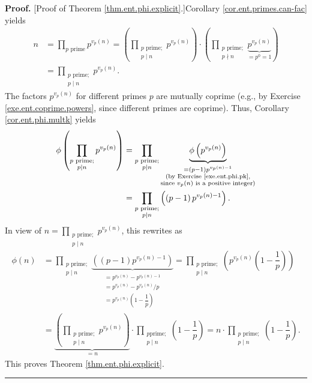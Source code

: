 \documentclass[numbers=enddot,12pt,final,onecolumn,notitlepage]{scrartcl}%
\numberwithin{exer}{subsection}
\theoremstyle{definition}
\newenvironment{proof}[1][Proof]{\noindent\textbf{#1.} }{\ \rule{0.5em}{0.5em}}
\let\prodnonlimits\prod
\renewcommand{\prod}{\prodnonlimits\limits}
\begin{document}
\begin{proof}
[Proof of Theorem \ref{thm.ent.phi.explicit}.]Corollary
\ref{cor.ent.primes.can-fac} yields%
\begin{align*}
n &  =\prod_{p\text{ prime}}p^{v_{p}\left(  n\right)  }=\left(  \prod
_{\substack{p\text{ prime;}\\p\mid n}}p^{v_{p}\left(  n\right)  }\right)
\cdot\left(  \prod_{\substack{p\text{ prime;}\\p\nmid n}}\underbrace{p^{v_{p}%
\left(  n\right)  }}_{=p^{0}=1}\right)  \\
&  =\prod_{\substack{p\text{ prime;}\\p\mid n}}p^{v_{p}\left(  n\right)  }.
\end{align*}
The factors $p^{v_{p}\left(  n\right)  }$ for different primes $p$ are
mutually coprime (e.g., by Exercise \ref{exe.ent.coprime.powers}, since
different primes are coprime). Thus, Corollary \ref{cor.ent.phi.multk} yields%
\begin{align*}
\phi\left(  \prod_{\substack{p\text{ prime;}\\p\mid n}}p^{v_{p}\left(
n\right)  }\right)   &  =\prod_{\substack{p\text{ prime;}\\p\mid
n}}\underbrace{\phi\left(  p^{v_{p}\left(  n\right)  }\right)  }%
_{\substack{=\left(  p-1\right)  p^{v_{p}\left(  n\right)  -1}\\\text{(by
Exercise \ref{exe.ent.phi.pk},}\\\text{since }v_{p}\left(  n\right)  \text{ is
a positive integer)}}}\\
&  =\prod_{\substack{p\text{ prime;}\\p\mid n}}\left(  \left(  p-1\right)
p^{v_{p}\left(  n\right)  -1}\right)  .
\end{align*}
In view of $n=\prod_{\substack{p\text{ prime;}\\p\mid n}}p^{v_{p}\left(
n\right)  }$, this rewrites as%
\begin{align*}
\phi\left(  n\right)   &  =\prod_{\substack{p\text{ prime;}\\p\mid
n}}\underbrace{\left(  \left(  p-1\right)  p^{v_{p}\left(  n\right)
-1}\right)  }_{\substack{=p^{v_{p}\left(  n\right)  }-p^{v_{p}\left(
n\right)  -1}\\=p^{v_{p}\left(  n\right)  }-p^{v_{p}\left(  n\right)
}/p\\=p^{v_{p}\left(  n\right)  }\left(  1-\dfrac{1}{p}\right)  }%
}=\prod_{\substack{p\text{ prime;}\\p\mid n}}\left(  p^{v_{p}\left(  n\right)
}\left(  1-\dfrac{1}{p}\right)  \right)  \\
&  =\underbrace{\left(  \prod_{\substack{p\text{ prime;}\\p\mid n}%
}p^{v_{p}\left(  n\right)  }\right)  }_{=n}\cdot\prod_{\substack{p\text{
prime;}\\p\mid n}}\left(  1-\dfrac{1}{p}\right)  =n\cdot\prod
_{\substack{p\text{ prime;}\\p\mid n}}\left(  1-\dfrac{1}{p}\right)  .
\end{align*}
This proves Theorem \ref{thm.ent.phi.explicit}.
\end{proof}
\end{document}
